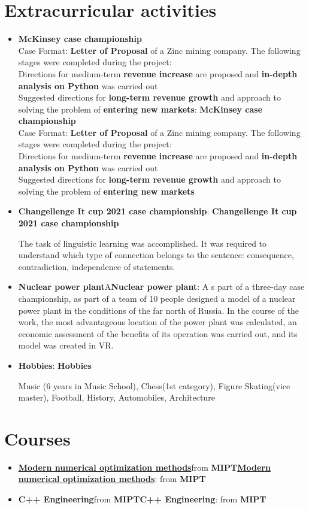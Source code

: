 \documentclass[letterpaper,10pt]{article}
\def \ifempty#1{\def\temp{#1} \ifx\temp\empty }
\newcommand{\resumeItem}[2]{
  \item\small{
  	\ifempty{#1}#2\else\textbf{#1}{: #2 \vspace{-2pt}}\fi
  }
}
\newcommand{\resumeSubItem}[2]{\resumeItem{#1}{#2}\vspace{-4pt}}
\newcommand{\resumeSubHeadingListStart}{\begin{itemize}[leftmargin=*]}
\newcommand{\resumeSubHeadingListEnd}{\end{itemize}}
\begin{document}
\section{Extracurricular activities}
  \resumeSubHeadingListStart
        \resumeSubItem{} {\textbf{McKinsey case championship\\}Case Format: \textbf{Letter of Proposal} of a Zinc mining company.
        The following stages were completed during the project:\\
        Directions for medium-term \textbf{revenue increase} are proposed and \textbf{in-depth analysis on Python} was carried out\\
        Suggested directions for \textbf{long-term revenue growth} and approach to solving the problem of \textbf{entering new markets}} 
        \resumeSubItem{}{\textbf{Changellenge It cup 2021 case championship}}
        
        The task of linguistic learning was accomplished. It was required to understand which type of connection belongs to the sentence: consequence, contradiction, independence of statements. 
        \resumeSubItem{\textbf{Nuclear power plant}} 

        As part of a three-day case championship, as part of a team of 10 people designed a model of a nuclear power plant in the
        conditions of the far north of Russia. In the course of the work, the most advantageous location of the power plant was
        calculated, an economic assessment of the benefits of its operation was carried out, and its model was created in VR.

        
        \resumeSubItem{} {\textbf{Hobbies}}
        
        Music (6 years in Music School), Chess(1st category), Figure Skating(vice master), Football, History, Automobiles, Architecture
        
    \resumeSubHeadingListEnd  
\section{{Courses}}


  \resumeSubHeadingListStart
        \resumeSubItem{\href{https://github.com/asapmed/optimization} {\textbf{Modern numerical optimization methods}}} {from \textbf{MIPT}}
        \resumeSubItem{ {\textbf{C++ Engineering}}}{from \textbf{MIPT}}
    \resumeSubHeadingListEnd
%
\end{document}
